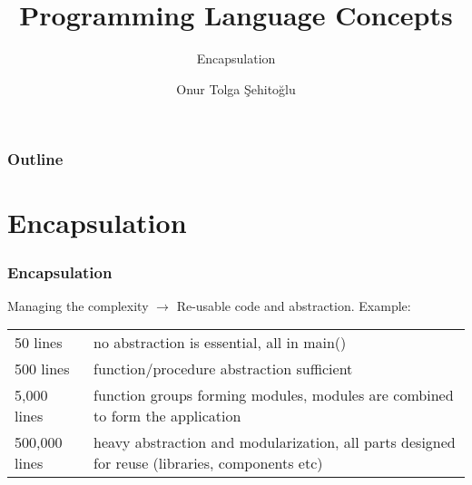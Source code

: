 \usepackage{etex}
\usepackage{tikz}
\usetikzlibrary{positioning,arrows,matrix,calc,shapes.multipart}
\usepackage[utf8]{inputenc}
\usepackage{listings}
\usepackage{multicol}

\def\circtxt#1{$\mathalpha \bigcirc \mkern-13mu \mathtt #1$}
\def\colorfline#1{\noalign{\color{#1} \hrule height 1pt}}
\def\colorline#1{\cr \noalign{\color{#1} \hrule height 1pt \vskip-3em}}

{
  \usepackage{fullpage}
  \usepackage{pgf}
  \usepackage{hyperref}
}

{

}


\title{Programming Language Concepts}
\subtitle{Encapsulation}
\author{Onur Tolga Şehitoğlu}
\subject{Encapsulation}
\date{}
	\titlegraphic{\insertmetutitle\insertlicense}



%
%
%
%

 \frame[plain]{\maketitle}
 \begin{frame}
 \frametitle{Outline}
 \begin{multicols}{2}
 \tableofcontents
 \end{multicols}
 \end{frame}

\section{Encapsulation}
\begin{frame}
\frametitle{Encapsulation}
Managing the complexity $\rightarrow$
Re-usable code and abstraction. Example:\\
\begin{tabular}{lp{.6\linewidth}}
 50 lines & no abstraction is essential, all in main() \\
 500 lines & function/procedure abstraction sufficient\\
 5,000 lines & function groups forming modules, modules are combined to form the application\\
 500,000 lines & heavy abstraction and modularization, all parts designed for reuse
 (libraries, components etc)
\end{tabular}
\end{frame}

